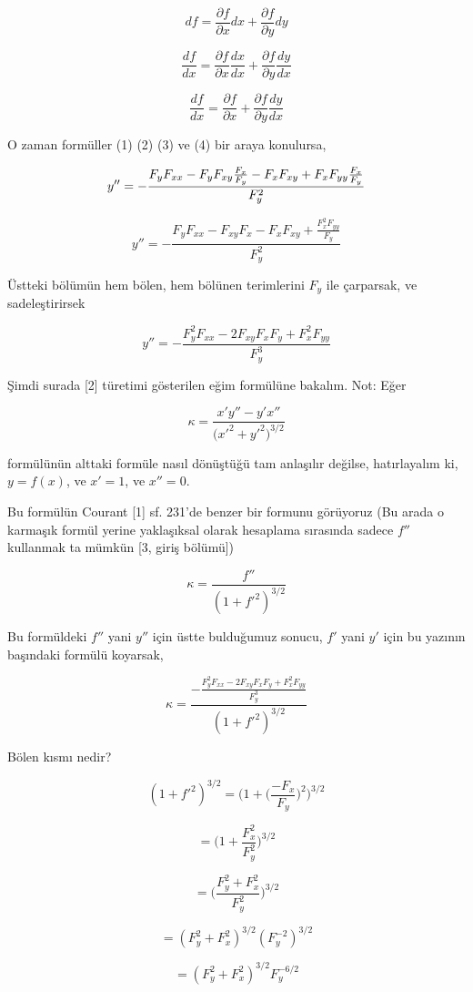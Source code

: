 \documentclass[12pt,fleqn]{article}\usepackage{../../common}
\begin{document}
$$ df = \frac{\partial f}{\partial x} dx + \frac{\partial f}{\partial y} dy  $$

$$ \frac{df}{dx} = \frac{\partial f}{\partial x} \frac{dx}{dx} + \frac{\partial f}{\partial y} \frac{dy}{dx}  $$

$$ \frac{df}{dx} = \frac{\partial f}{\partial x} + \frac{\partial f}{\partial y} \frac{dy}{dx}  $$

O zaman formüller (1) (2) (3) ve (4) bir araya konulursa,

$$ y '' = - \frac{F_yF_{xx} - F_y F_{xy}\frac{F_x}{F_y} - F_xF_{xy} + F_xF_{yy}\frac{F_x}{F_y}}{F_y^2}\\ $$

$$ y '' = - \frac{F_yF_{xx} - F_{xy}F_x - F_xF_{xy} + \frac{F_x^2F_{yy}}{F_y}}{F_y^2} $$

Üstteki bölümün hem bölen, hem bölünen terimlerini $F_y$ ile çarparsak, ve
sadeleştirirsek

$$ y '' = - \frac{F_y^2F_{xx} - 2F_{xy}F_xF_y + F_x^2F_{yy}}{F_y^3} $$

Şimdi surada [2] türetimi gösterilen eğim  formülüne
bakalım. Not: Eğer

$$ \kappa = \frac{x'y''-y'x''}{\bigg(x'^2 + y'^2 \bigg)^{3/2}} $$

formülünün alttaki formüle nasıl dönüştüğü tam anlaşılır değilse,
hatırlayalım ki, $y=f(x)$, ve $x'=1$, ve $x'' = 0$.

Bu formülün Courant [1] sf. 231'de benzer bir formunu görüyoruz (Bu arada o
karmaşık formül yerine yaklaşıksal olarak hesaplama sırasında sadece $f''$
kullanmak ta mümkün [3, giriş bölümü])

$$ \kappa = \frac{f''}{(1+f'^2)^{3/2}} $$

Bu formüldeki $f''$ yani $y''$ için üstte bulduğumuz sonucu, $f'$ yani $y'$
için bu yazının başındaki formülü koyarsak,

$$ 
\kappa = \frac
{-\frac
{\displaystyle F_y^2F_{xx} - 2F_{xy}F_xF_y +  F_x^2F_{yy}}{\displaystyle F_y^3}}
{(1+f'^2)^{3/2}} 
$$  

Bölen kısmı nedir?

$$ (1+f'^2)^{3/2} = \bigg( 1 + \bigg(\frac{-F_x}{F_y}\bigg)^2 \bigg)^{3/2}  $$

$$ = \bigg( 1 + \frac{F_x^2}{F_y^2} \bigg)^{3/2}  $$

$$ = \bigg( \frac{F_y^2 + F_x^2}{F_y^2} \bigg)^{3/2}  $$

$$ = (F_y^2 + F_x^2)^{3/2}(F_y^{-2})^{3/2}  $$

$$ = (F_y^2 + F_x^2)^{3/2}F_y^{-6/2}  $$
\end{document}
